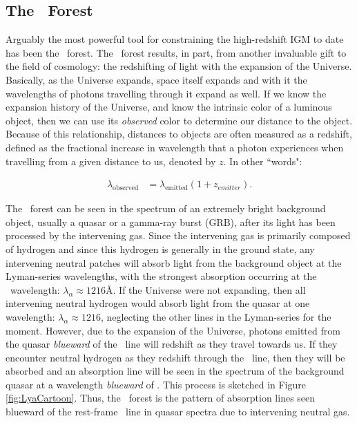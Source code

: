 \subsection{The \lya\ Forest}

Arguably the most powerful tool for constraining the high-redshift IGM to date has been the \lya\ forest. The \lya\ forest results, in part, from another invaluable gift to the field of cosmology: the redshifting of light with the expansion of the Universe. Basically, as the Universe expands, space itself expands and with it the wavelengths of photons travelling through it expand as well. If we know the expansion history of the Universe, and know the intrinsic color of a luminous object, then we can use its \textit{observed} color to determine our distance to the object. Because of this relationship, distances to objects are often measured as a redshift, defined as the fractional increase in wavelength that a photon experiences when travelling from a given distance to us, denoted by $z$. In other ``words": 

\begin{align}
\lambda_{\text{observed}} &= \lambda_{\text{emitted}}(1+z_{emitter}). 
\end{align}

The \lya\ forest can be seen in the spectrum of an extremely bright background object, usually a quasar or a gamma-ray burst (GRB), after its light has been processed by the intervening gas. Since the intervening gas is primarily composed of hydrogen and since this hydrogen is generally in the ground state, any intervening neutral patches will absorb light from the background object at the Lyman-series wavelengths, with the strongest absorption occurring at the \lya\ wavelength: $\lambda_{\alpha} \approx 1216$\AA. If the Universe were not expanding, then all intervening neutral hydrogen would absorb light from the quasar at one wavelength: $\lambda_{\alpha} \approx 1216$\angstrom, neglecting the other lines in the Lyman-series for the moment. However, due to the expansion of the Universe, photons emitted from the quasar \textit{blueward} of the \lya\ line will redshift as they travel towards us. If they encounter neutral hydrogen as they redshift through the \lya\ line, then they will be absorbed and an absorption line will be seen in the spectrum of the background quasar at a wavelength \textit{blueward} of \lya. This process is sketched in Figure \ref{fig:LyaCartoon}. Thus, the \lya\ forest is the pattern of absorption lines seen blueward of the rest-frame \lya\ line in quasar spectra due to intervening neutral gas. 

